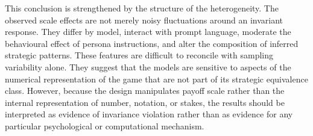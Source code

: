 \documentclass[11pt,a4paper]{article}
\begin{document}
This conclusion is strengthened by the structure of the heterogeneity. The observed scale effects are not merely noisy fluctuations around an invariant response. They differ by model, interact with prompt language, moderate the behavioural effect of persona instructions, and alter the composition of inferred strategic patterns. These features are difficult to reconcile with sampling variability alone. They suggest that the models are sensitive to aspects of the numerical representation of the game that are not part of its strategic equivalence class. However, because the design manipulates payoff scale rather than the internal representation of number, notation, or stakes, the results should be interpreted as evidence of invariance violation rather than as evidence for any particular psychological or computational mechanism.


\end{document}
